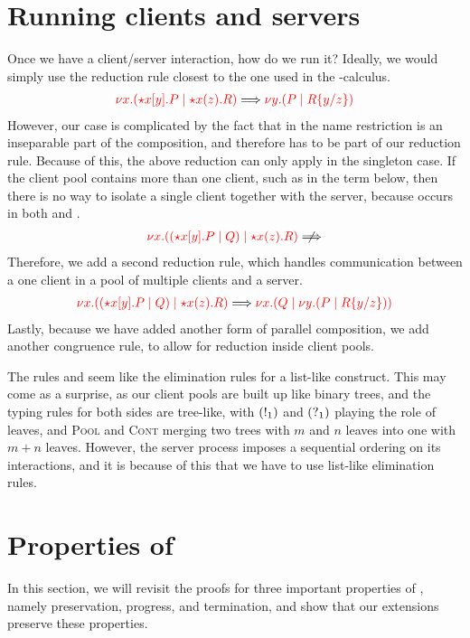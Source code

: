 \section{Running clients and servers}
Once we have a client/server interaction, how do we run it? Ideally, we would
simply use the reduction rule closest to the one used in the \textpi-calculus. 
\begin{gather*}
  \reducesto
  {\tm{\cpCut{x}{\ncCnt{x}{y}{P}}{\ncSrv{x}{z}{R}}}}
  {\tm{\cpCut{y}{P}{\cpSub{y}{z}{R}}}}
\end{gather*}
However, our case is complicated by the fact that in  the
name restriction is an inseparable part of the composition, and therefore has to
be part of our reduction rule. 
Because of this, the above reduction can only apply in the singleton case.
If the client pool contains more than one client, such as in the term below,
then there is no way to isolate a single client together with the server,
because  occurs in both  and .
\begin{gather*}
  \tm{\cpCut{x}{\ncPool{\ncCnt{x}{y}{P}}{Q}}{\ncSrv{x}{z}{R}}}
  \centernot\Longrightarrow
\end{gather*}
Therefore, we add a second reduction rule, which handles communication between a
one client in a pool of multiple clients and a server.
\begin{gather*}
  \reducesto
  {\tm{\cpCut{x}{\ncPool{\ncCnt{x}{y}{P}}{Q}}{\ncSrv{x}{z}{R}}}}
  {\tm{\cpCut{x}{Q}{\cpCut{y}{P}{\cpSub{y}{z}{R}}}}}
\end{gather*}
Lastly, because we have added another form of parallel composition, we add
another congruence rule, to allow for reduction inside client pools.


The rules  and  seem like the elimination
rules for a list-like construct. This may come as a surprise, as our client
pools are built up like binary trees, and the typing rules for both sides are
tree-like, with $(\take[1]{})$ and $(\give[1]{})$ playing the role of leaves,
and \textsc{Pool} and \textsc{Cont} merging two trees with $m$ and $n$ leaves
into one with $m+n$ leaves.
However, the server process imposes a sequential ordering on its interactions,
and it is because of this that we have to use list-like elimination rules.

\section{Properties of \nodcap}
In this section, we will revisit the proofs for three important properties of
\rcp, namely preservation, progress, and termination, and show that our
extensions preserve these properties.


